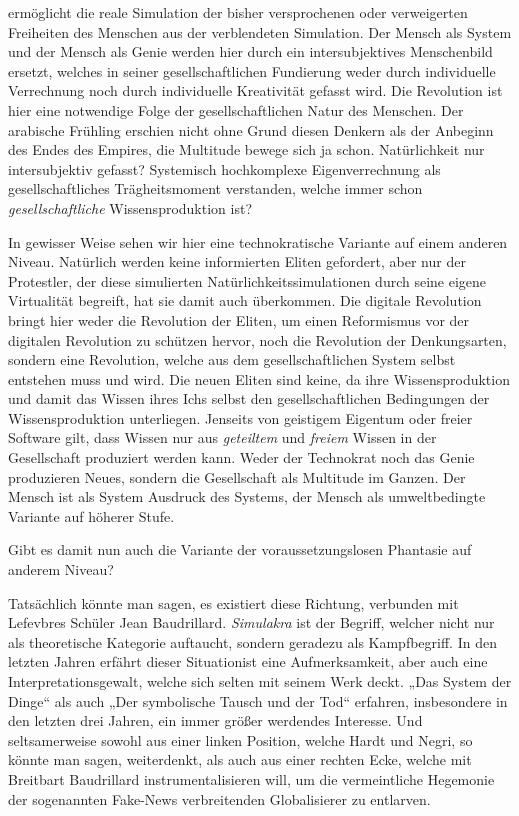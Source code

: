 \documentclass[a4paper,11pt]{article}
\begin{document}
ermöglicht die reale Simulation der bisher versprochenen oder verweigerten
Freiheiten des Menschen aus der verblendeten Simulation. Der Mensch als System
und der Mensch als Genie werden hier durch ein intersubjektives Menschenbild
ersetzt, welches in seiner gesellschaftlichen Fundierung weder durch
individuelle Verrechnung noch durch individuelle Kreativität gefasst wird. Die
Revolution ist hier eine notwendige Folge der gesellschaftlichen Natur des
Menschen. Der arabische Frühling erschien nicht ohne Grund diesen Denkern als
der Anbeginn des Endes des Empires, die Multitude bewege sich ja
schon. Natürlichkeit nur intersubjektiv gefasst? Systemisch hochkomplexe
Eigenverrechnung als gesellschaftliches Trägheitsmoment verstanden, welche
immer schon \emph{gesellschaftliche} Wissensproduktion ist?

In gewisser Weise sehen wir hier eine technokratische Variante auf einem
anderen Niveau. Natürlich werden keine informierten Eliten gefordert, aber nur
der Protestler, der diese simulierten Natürlichkeitssimulationen durch seine
eigene Virtualität begreift, hat sie damit auch überkommen. Die digitale
Revolution bringt hier weder die Revolution der Eliten, um einen Reformismus
vor der digitalen Revolution zu schützen hervor, noch die Revolution der
Denkungsarten, sondern eine Revolution, welche aus dem gesellschaftlichen
System selbst entstehen muss und wird. Die neuen Eliten sind keine, da ihre
Wissensproduktion und damit das Wissen ihres Ichs selbst den
gesellschaftlichen Bedingungen der Wissensproduktion unterliegen. Jenseits von
geistigem Eigentum oder freier Software gilt, dass Wissen nur aus
\emph{geteiltem} und \emph{freiem} Wissen in der Gesellschaft produziert
werden kann. Weder der Technokrat noch das Genie produzieren Neues, sondern
die Gesellschaft als Multitude im Ganzen. Der Mensch ist als System Ausdruck
des Systems, der Mensch als umweltbedingte Variante auf höherer Stufe.

Gibt es damit nun auch die Variante der voraussetzungslosen Phantasie auf
anderem Niveau?

Tatsächlich könnte man sagen, es existiert diese Richtung, verbunden mit
Lefevbres Schüler Jean Baudrillard. \emph{Simulakra} ist der Begriff, welcher
nicht nur als theoretische Kategorie auftaucht, sondern geradezu als
Kampfbegriff. In den letzten Jahren erfährt dieser Situationist eine
Aufmerksamkeit, aber auch eine Interpretationsgewalt, welche sich selten mit
seinem Werk deckt.  „Das System der Dinge“ als auch „Der symbolische Tausch
und der Tod“ erfahren, insbesondere in den letzten drei Jahren, ein immer
größer werdendes Interesse. Und seltsamerweise sowohl aus einer linken
Position, welche Hardt und Negri, so könnte man sagen, weiterdenkt, als auch
aus einer rechten Ecke, welche mit Breitbart Baudrillard instrumentalisieren
will, um die vermeintliche Hegemonie der sogenannten Fake-News verbreitenden
Globalisierer zu entlarven.
\end{document}
